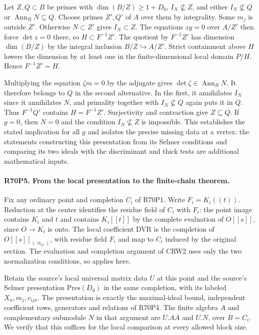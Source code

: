 Let $Z,Q\subset B$ be primes with $\dim(B/Z)\ge1+D_0$,
$I_N\not\subseteq Z$, and either $I_N\not\subseteq Q$ or
$\operatorname{Ann}_B N\subseteq Q$. Choose primes $Z',Q'$
of $A$ over them by integrality. Some $m_j$ is outside $Z'$.
Otherwise $N\subset Z'$ gives $I_N\subset Z$. The equations
$zy=0$ over $A/Z'$ then force $\det z=0$ there, so
$H\subset F^{-1}Z'$. The quotient by $F^{-1}Z'$ has dimension
$\dim(B/Z)$ by the integral inclusion $B/Z\hookrightarrow A/Z'$.
Strict containment above $H$ lowers the dimension by at least one
in the finite-dimensional local domain $P/H$. Hence
$F^{-1}Z'=H$.

Multiplying the equation $\zeta m=0$ by the adjugate gives
$\det\zeta\in\operatorname{Ann}_B N$. It therefore belongs to
$Q$ in the second alternative. In the first, it annihilates
$I_N$ since it annihilates $N$, and primality together with
$I_N\not\subseteq Q$ again puts it in $Q$. Thus
$F^{-1}Q'$ contains $H=F^{-1}Z'$. Surjectivity and contraction
give $Z\subseteq Q$. If $g=0$, then $N=0$ and the condition
$I_N\not\subseteq Z$ is impossible. This establishes the stated
implication for all $g$ and isolates the precise missing data at
a vertex: the statements constructing this presentation from
its Selmer conditions and comparing its two ideals with the
discriminant and thick tests are additional mathematical inputs.

\paragraph{R70P5. From the local presentation to the finite-chain theorem.}
Fix any ordinary point and completion $C_i$ of R70P1. Write
$F_i=K_i((t))$. Reduction at the center identifies the residue
field of $C_i$ with $F_i$: the point image contains $K_i$ and $t$
and contains $K_i[[t]]$ by the complete evaluation of $O[[s]]$,
since $O\to K_i$ is onto. The local coefficient DVR is the
completion of $O[[s]]_{(\varpi_O)}$, with residue field $F_i$
and map to $C_i$ induced by the original section. The evaluation
and completion argument of CRW2 uses only the two normalization
conditions, so applies here.

Retain the source's local universal matrix data $U$ at this point
and the source's Selmer presentation $\mathrm{Pres}(D_0)$ in
the same completion, with its labeled $X_a,m_j,c_{ija}$. The
presentation is exactly the maximal-ideal bound, independent
coefficient rows, generators and relations of R70P4. The finite
algebra $A$ and complementary submodule $N$ in that argument
are $U.AA$ and $U.N$, over $B=C_i$. We verify that this suffices
for the local comparison at every allowed block size.

